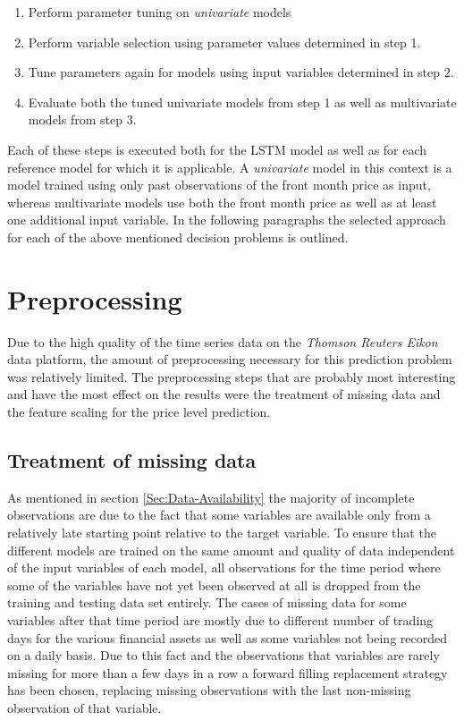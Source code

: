 \begin{enumerate}
\item Perform parameter tuning on \textit{univariate} models
\item Perform variable selection using parameter values determined in step 1.
\item Tune parameters again for models using input variables determined in step 2.
\item Evaluate both the tuned univariate models from step 1 as well as multivariate models from step 3. 
\end{enumerate}
Each of these steps is executed both for the LSTM model as well as for each reference model for which it is applicable.
A \textit{univariate} model in this context is a model trained using only past observations of the front month price as input, whereas multivariate models use both the front month price as well as at least one additional input variable. In the following paragraphs the selected approach for each of the above mentioned decision problems is outlined.

\section{Preprocessing}
Due to the high quality of the time series data on the \textit{Thomson Reuters Eikon} data platform, the amount of preprocessing necessary for this prediction problem was relatively limited. The preprocessing steps that are probably most interesting and have the most effect on the results were the treatment of missing data and the feature scaling for the price level prediction.
\subsection{Treatment of missing data}
As mentioned in section \ref{Sec:Data-Availability} the majority of incomplete observations are due to the fact that some variables are available only from a relatively late starting point relative to the target variable. To ensure that the different models are trained on the same amount and quality of data independent of the input variables of each model, all observations for the time period where some of the variables have not yet been observed at all is dropped from the training and testing data set entirely. The cases of missing data for some variables after that time period are mostly due to different number of trading days for the various financial assets as well as some variables not being recorded on a daily basis. Due to this fact and the observations that variables are rarely missing for more than a few days in a row a forward filling replacement strategy has been chosen, replacing missing observations with the last non-missing observation of that variable.
